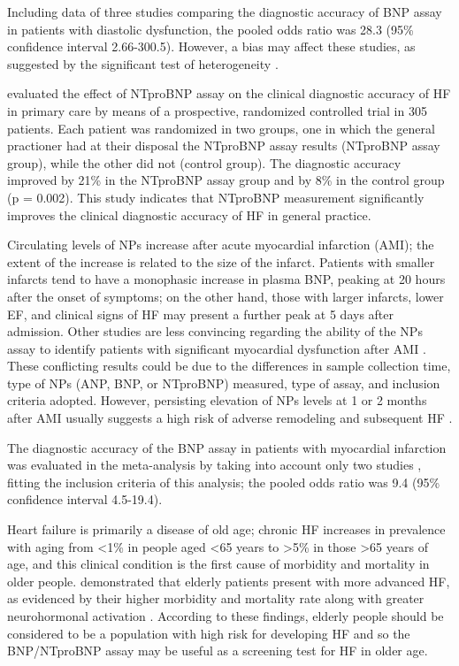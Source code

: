\documentclass[14pt,a4paper,onecolumn]{extarticle}
\begin{document}
Including data of three studies comparing the diagnostic accuracy of BNP assay in patients with diastolic dysfunction, the pooled odds ratio was 28.3 (95\% confidence interval 2.66-300.5). However, a bias may affect these studies, as suggested by the significant test of heterogeneity \citep{bib372}.

\citep{bib3133} evaluated the effect of NTproBNP assay on the clinical diagnostic accuracy of HF in primary care by means of a prospective, randomized controlled trial in 305 patients. Each patient was randomized in two groups, one in which the general practioner had at their disposal the NTproBNP assay results (NTproBNP assay group), while the other did not (control group). The diagnostic accuracy improved by 21\% in the NTproBNP assay group and by 8\% in the control group (p = 0.002). This study indicates that NTproBNP measurement significantly improves the clinical diagnostic accuracy of HF in general practice.

Circulating levels of NPs increase after acute myocardial infarction (AMI); the extent of the increase is related to the size of the infarct. Patients with smaller infarcts tend to have a monophasic increase in plasma BNP, peaking at 20 hours after the onset of symptoms; on the other hand, those with larger infarcts, lower EF, and clinical signs of HF may present a further peak at 5 days after admission. Other studies are less convincing regarding the ability of the NPs assay to identify patients with significant myocardial dysfunction after AMI \citep{bib3139}. These conflicting results could be due to the differences in sample collection time, type of NPs (ANP, BNP, or NTproBNP) measured, type of assay, and inclusion criteria adopted. However, persisting elevation of NPs levels at 1 or 2 months after AMI usually suggests a high risk of adverse remodeling and subsequent HF \citep{bib35}.

The diagnostic accuracy of the BNP assay in patients with myocardial infarction was evaluated in the meta-analysis by \citep{bib372} taking into account only two studies \citep{bib3140} \citep{bib3177}, fitting the inclusion criteria of this analysis; the pooled odds ratio was 9.4 (95\% confidence interval 4.5-19.4).

Heart failure is primarily a disease of old age; chronic HF increases in prevalence with aging from <1\% in people aged <65 years to >5\% in those >65 years of age, and this clinical condition is the first cause of morbidity and mortality in older people. \citep{bib3193} demonstrated that elderly patients present with more advanced HF, as evidenced by their higher morbidity and mortality rate along with greater neurohormonal activation . According to these findings, elderly people should be considered to be a population with high risk for developing HF and so the BNP/NTproBNP assay may be useful as a screening test for HF in older age.
\end{document}
